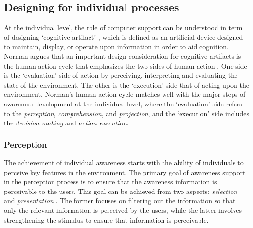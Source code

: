 \subsection{Designing for individual processes} %
\label{sub:designing_for_individuals}
At the individual level, the role of computer support can be understood in term of designing `cognitive artifact' \cite{Norman1992}, which is defined as an artificial device designed to maintain, display, or operate upon information in order to aid cognition. Norman argues that an important design consideration for cognitive artifacts is the human action cycle that emphasizes the two sides of human action \cite{Norman1992}. One side is the `evaluation' side of action by perceiving, interpreting and evaluating the state of the environment. The other is the `execution' side that of acting upon the environment. Norman's human action cycle matches well with the major steps of awareness development at the individual level, where the `evaluation' side refers to the \emph{perception}, \emph{comprehension}, and \emph{projection}, and the `execution' side includes the \emph{decision making} and \emph{action execution}.

\subsubsection*{Perception} %
\label{ssub:perception}

The achievement of individual awareness starts with the ability of individuals to perceive key features in the environment. The primary goal of awareness support in the perception process is to ensure that the awareness information is perceivable to the users. This goal can be achieved from two aspects: \emph{selection} and \emph{presentation} \cite{Berlage1999}. The former focuses on filtering out the information so that only the relevant information is perceived by the users, while the latter involves strengthening the stimulus to ensure that information is perceivable.

